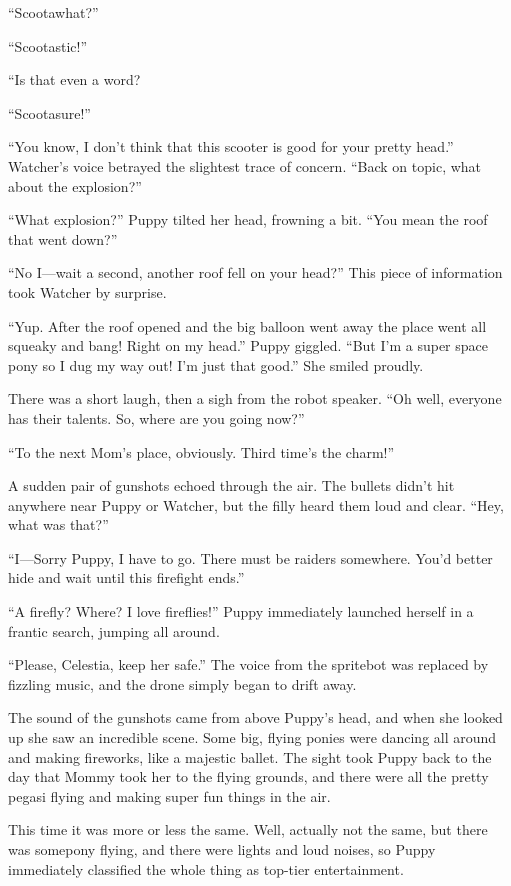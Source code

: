 ``Scootawhat?''

``Scootastic!''

``Is that even a word?

``Scootasure!''

``You know, I don't think that this scooter is good for your pretty head.'' Watcher's voice betrayed the slightest trace of concern. ``Back on topic, what about the explosion?''

``What explosion?'' Puppy tilted her head, frowning a bit. ``You mean the roof that went down?''

``No I---wait a second, another roof fell on your head?'' This piece of information took Watcher by surprise.

``Yup. After the roof opened and the big balloon went away the place went all squeaky and bang! Right on my head.'' Puppy giggled. ``But I'm a super space pony so I dug my way out! I'm just that good.'' She smiled proudly.

There was a short laugh, then a sigh from the robot speaker. ``Oh well, everyone has their talents. So, where are you going now?''

``To the next Mom's place, obviously. Third time's the charm!''


A sudden pair of gunshots echoed through the air. The bullets didn't hit anywhere near Puppy or Watcher, but the filly heard them loud and clear. ``Hey, what was that?''

``I---Sorry Puppy, I have to go. There must be raiders somewhere. You'd better hide and wait until this firefight ends.''

``A firefly? Where? I love fireflies!'' Puppy immediately launched herself in a frantic search, jumping all around.

``Please, Celestia, keep her safe.'' The voice from the spritebot was replaced by fizzling music, and the drone simply began to drift away.

The sound of the gunshots came from above Puppy's head, and when she looked up she saw an incredible scene. Some big, flying ponies were dancing all around and making fireworks, like a majestic ballet. The sight took Puppy back to the day that Mommy took her to the flying grounds, and there were all the pretty pegasi flying and making super fun things in the air.

This time it was more or less the same. Well, actually not the same, but there was somepony flying, and there were lights and loud noises, so Puppy immediately classified the whole thing as top-tier entertainment.

